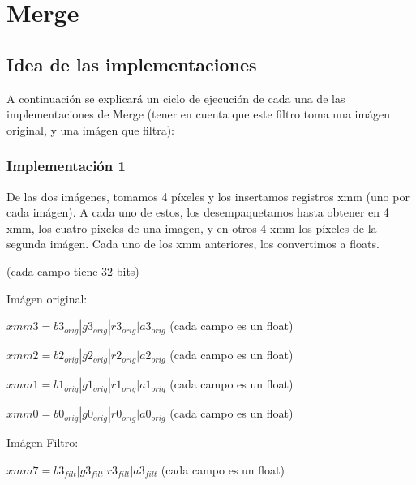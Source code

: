 \documentclass[a4paper]{article}
\begin{document}
\newpage
\section{Merge}

\subsection{Idea de las implementaciones}
A continuación se explicará un ciclo de ejecución de cada una de las implementaciones de Merge (tener en cuenta que este filtro toma una imágen original, y una imágen que filtra):

\subsubsection{Implementación 1}
De las dos imágenes, tomamos 4 píxeles y los insertamos registros xmm (uno por cada imágen). A cada uno de estos, los desempaquetamos hasta obtener en 4 xmm, los cuatro pixeles de una imagen, y en otros 4 xmm los píxeles de la segunda imágen. Cada uno de los xmm anteriores, los convertimos a floats.
\vspace*{0.3cm}

(cada campo tiene 32 bits)

Imágen original:

\vspace*{0.3cm}

$xmm3 = b3_{orig} | g3_{orig} | r3_{orig} | a3_{orig}$   (cada campo es un float)

\vspace*{0.3cm}

$xmm2 = b2_{orig} | g2_{orig} | r2_{orig} | a2_{orig}$   (cada campo es un float)

\vspace*{0.3cm}

$xmm1 = b1_{orig} | g1_{orig} | r1_{orig} | a1_{orig}$   (cada campo es un float)

\vspace*{0.3cm}

$xmm0 = b0_{orig} | g0_{orig} | r0_{orig} | a0_{orig}$   (cada campo es un float)

\vspace*{0.3cm}

Imágen Filtro:

\vspace*{0.3cm}

$xmm7 = b3_{filt} | g3_{filt} | r3_{filt} | a3_{filt}$   (cada campo es un float)
\end{document}
